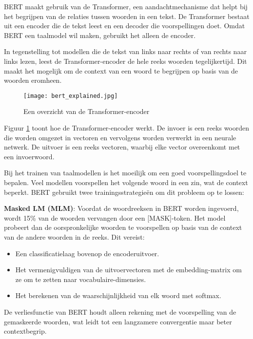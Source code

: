 BERT maakt gebruik van de Transformer, een aandachtmechanisme dat helpt bij het begrijpen van de relaties tussen woorden in een tekst. De Transformer bestaat uit een encoder die de tekst leest en een decoder die voorspellingen doet. Omdat BERT een taalmodel wil maken, gebruikt het alleen de encoder.

In tegenstelling tot modellen die de tekst van links naar rechts of van rechts naar links lezen, leest de Transformer-encoder de hele reeks woorden tegelijkertijd. Dit maakt het mogelijk om de context van een woord te begrijpen op basis van de woorden eromheen.

\begin{figure}[ht]
    \centering
    \texttt{[image: bert\_explained.jpg]}
    \caption{Een overzicht van de Transformer-encoder}
    \label{fig:bert_explained}
\end{figure}

Figuur \ref{fig:bert_explained} toont hoe de Transformer-encoder werkt. De invoer is een reeks woorden die worden omgezet in vectoren en vervolgens worden verwerkt in een neurale netwerk. De uitvoer is een reeks vectoren, waarbij elke vector overeenkomt met een invoerwoord.

Bij het trainen van taalmodellen is het moeilijk om een goed voorspellingsdoel te bepalen. Veel modellen voorspellen het volgende woord in een zin, wat de context beperkt. BERT gebruikt twee trainingsstrategieën om dit probleem op te lossen:

\textbf{Masked LM (MLM)}: Voordat de woordreeksen in BERT worden ingevoerd, wordt 15\% van de woorden vervangen door een [MASK]-token. Het model probeert dan de oorspronkelijke woorden te voorspellen op basis van de context van de andere woorden in de reeks. Dit vereist:

\begin{itemize}
    \item Een classificatielaag bovenop de encoderuitvoer.
    \item Het vermenigvuldigen van de uitvoervectoren met de embedding-matrix om ze om te zetten naar vocabulaire-dimensies.
    \item Het berekenen van de waarschijnlijkheid van elk woord met softmax.
\end{itemize}

De verliesfunctie van BERT houdt alleen rekening met de voorspelling van de gemaskeerde woorden, wat leidt tot een langzamere convergentie maar beter contextbegrip.

